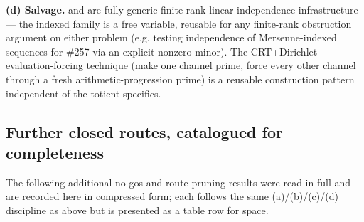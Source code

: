 \textbf{(d) Salvage.}  and
 are fully generic finite-rank
linear-independence infrastructure — the indexed family is a free variable,
reusable for any finite-rank obstruction argument on either problem (e.g.
testing independence of Mersenne-indexed sequences for \#257 via an explicit
nonzero minor). The CRT+Dirichlet evaluation-forcing technique (make one
channel prime, force every other channel through a fresh arithmetic-progression
prime) is a reusable construction pattern independent of the totient
specifics.

\subsection{Further closed routes, catalogued for completeness}

The following additional no-gos and route-pruning results were read in full
and are recorded here in compressed form; each follows the same (a)/(b)/(c)/(d)
discipline as above but is presented as a table row for space.

